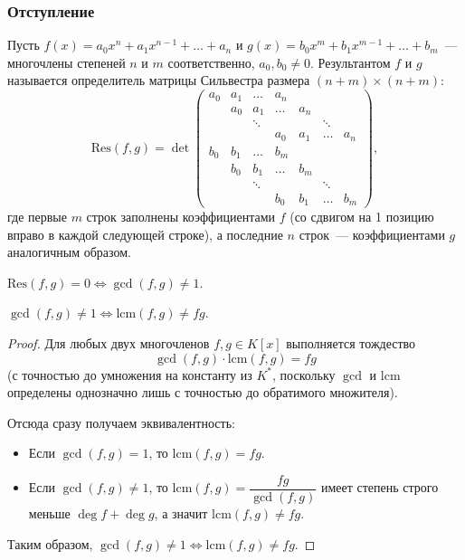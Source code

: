 \documentclass[12pt]{article}
\begin{document}
    \subsubsection{Отступление}
    
    \begin{definition}[Результант]
    	Пусть $f(x) = a_0x^n + a_1x^{n-1} + \dots + a_n$ и $g(x) = b_0x^m + b_1x^{m-1} + \dots + b_m$~--- многочлены степеней $n$ и $m$ соответственно, $a_0, b_0 \ne 0$. Результантом $f$ и $g$ называется определитель матрицы Сильвестра размера $(n+m) \times (n+m)$:
    	\[
    		\mathrm{Res}(f, g) = \det
    		\begin{pmatrix}
    			a_0 & a_1 & \dots & a_n &        &        &        \\
    			    & a_0 & a_1 & \dots & a_n &        &        \\
    			    &     & \ddots &     &     & \ddots &        \\
    			    &     &     & a_0 & a_1 & \dots & a_n     \\
    			b_0 & b_1 & \dots & b_m &        &        &        \\
    			    & b_0 & b_1 & \dots & b_m &        &        \\
    			    &     & \ddots &     &     & \ddots &        \\
    			    &     &     & b_0 & b_1 & \dots & b_m
    		\end{pmatrix},
    	\]
    	где первые $m$ строк заполнены коэффициентами $f$ (со сдвигом на 1 позицию вправо в каждой следующей строке), а последние $n$ строк~--- коэффициентами $g$ аналогичным образом.
    \end{definition}
    
    \begin{statement}
    	$\mathrm{Res}(f, g) = 0 \Leftrightarrow \gcd(f, g) \ne 1$.
    \end{statement}
    
    \begin{statement}
    	$\gcd(f, g) \ne 1 \Leftrightarrow \mathrm{lcm}(f, g) \ne fg$.
    \end{statement}
    
    \begin{proof}
    	Для любых двух многочленов $f, g \in K[x]$ выполняется тождество
    	\[
    		\gcd(f, g) \cdot \mathrm{lcm}(f, g) = fg
    	\]
    	(с точностью до умножения на константу из $K^*$, поскольку $\gcd$ и $\mathrm{lcm}$ определены однозначно лишь с точностью до обратимого множителя).
    	
    	Отсюда сразу получаем эквивалентность:
    	\begin{itemize}
    		\item Если $\gcd(f, g) = 1$, то $\mathrm{lcm}(f, g) = fg$.
    		\item Если $\gcd(f, g) \ne 1$, то $\mathrm{lcm}(f,g) = \dfrac{fg}{\gcd(f,g)}$ имеет степень строго меньше $\deg f + \deg g$, а значит $\mathrm{lcm}(f,g) \ne fg$.
    	\end{itemize}
    	
    	Таким образом, $\gcd(f,g) \ne 1 \Leftrightarrow \mathrm{lcm}(f,g) \ne fg$.
    \end{proof}
    
\end{document}
